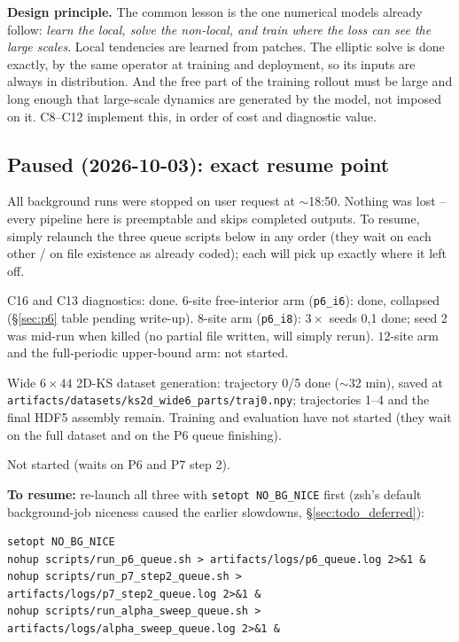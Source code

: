 \documentclass[11pt]{article}
\begin{document}
\textbf{Design principle.} The common lesson is the one numerical models
already follow: \emph{learn the local, solve the non-local, and train
where the loss can see the large scales}. Local tendencies are learned
from patches. The elliptic solve is done exactly, by the same operator at
training and deployment, so its inputs are always in distribution. And
the free part of the training rollout must be large and long enough that
large-scale dynamics are generated by the model, not imposed on it.
C8--C12 implement this, in order of cost and diagnostic value.

\subsection{Paused (2026-10-03): exact resume point}
\label{sec:paused_state}

All background runs were stopped on user request at $\sim$18:50. Nothing
was lost -- every pipeline here is preemptable and skips completed
outputs. To resume, simply relaunch the three queue scripts below in any
order (they wait on each other / on file existence as already coded);
each will pick up exactly where it left off.

\begin{description}[leftmargin=*]
\item[P6 (\texttt{scripts/run\_p6\_queue.sh}).] C16 and C13 diagnostics:
  done. $6$-site free-interior arm (\texttt{p6\_i6}): done, collapsed
  (\S\ref{sec:p6} table pending write-up). $8$-site arm
  (\texttt{p6\_i8}): $3\times$ seeds 0,1 done; seed 2 was mid-run when
  killed (no partial file written, will simply rerun). $12$-site arm and
  the full-periodic upper-bound arm: not started.
\item[P7 step 2 (\texttt{scripts/run\_p7\_step2\_queue.sh}).] Wide
  $6\times44$ 2D-KS dataset generation: trajectory 0/5 done ($\sim$32
  min), saved at
  \texttt{artifacts/datasets/ks2d\_wide6\_parts/traj0.npy}; trajectories
  1--4 and the final HDF5 assembly remain. Training and evaluation have
  not started (they wait on the full dataset and on the P6 queue
  finishing).
\item[P8 / drag sweep (\texttt{scripts/run\_alpha\_sweep\_queue.sh}).]
  Not started (waits on P6 and P7 step 2).
\end{description}

\textbf{To resume:} re-launch all three with \texttt{setopt NO\_BG\_NICE}
first (zsh's default background-job niceness caused the earlier
slowdowns, \S\ref{sec:todo_deferred}):
\begin{verbatim}
setopt NO_BG_NICE
nohup scripts/run_p6_queue.sh > artifacts/logs/p6_queue.log 2>&1 &
nohup scripts/run_p7_step2_queue.sh > artifacts/logs/p7_step2_queue.log 2>&1 &
nohup scripts/run_alpha_sweep_queue.sh > artifacts/logs/alpha_sweep_queue.log 2>&1 &
\end{verbatim}
\end{document}
